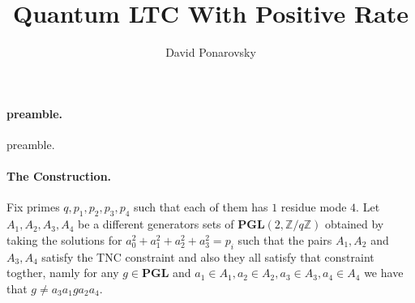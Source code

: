 \documentclass{article}
\begin{document}
\title{Quantum LTC With Positive Rate}
\author{David Ponarovsky}
\maketitle
\begin{multicols*}{2}
\newcommand{ \Hw }{ \delta\Delta -\Delta^{\frac{1}{2}-\varepsilon}/\delta  }
	\newcommand{ \Nw }{ \Delta^{\frac{3}{2}-\varepsilon}} 
	  \newcommand{ \Gu } { \Gamma^{\cup} }
	  \newcommand{ \Guq } { \Gamma^{\cup, \square} }

    	\newcommand{ \Gsa } {\Gamma_{\square_{1}} }
	\newcommand{ \Gsah } { \Gamma_{\square_{1}}^{h}} 
	\newcommand{ \Gsb } {\Gamma_{\square_{2}} }
	\newcommand{ \Gsbh } {\Gamma_{\square_{2}}^{h} }
	\newcommand{ \Gssh } { \Gamma_{\square \square }^{h}}
        \newcommand{ \Aa } { C_{A_{1}}}  
	\newcommand{ \Ab } { C_{A_{2}}}
	\newcommand{ \Ac } { C_{A_{3}}}
	\newcommand{ \Ad } { C_{A_{4}}}
	\newcommand{ \Aab } { \Aa \otimes \Ab } 
	\newcommand{ \Acd } { \Ac \otimes \Ad } 
	\newcommand{ \Aac } { \Aa \otimes \Ac }
	\newcommand{ \Aabc } { \Aa \otimes \Ab \otimes \Ac }
	\newcommand{ \Aabp } { \Aa^{\perp} \otimes \Ab^{\perp} } 
	\newcommand{ \Aacp } { \Aa^{\perp} \otimes \Ac^{\perp} }
	\newcommand{ \Acdp } { \Ac^{\perp} \otimes \Ad^{\perp} }
	\newcommand{ \Aabcdp } { \Aabp \otimes \Acdp }
	\newcommand{ \Aabcp } { \Aa^{\perp} \otimes \Ab^{\perp} \otimes \Ac^{\perp} }
	\newcommand{ \Aabpp } { \left( \Aabp \right)^\perp } 
	\newcommand{ \Acdpp } { \left( \Acdp \right)^\perp } 
	\newcommand{ \Aacpp } { \left( \Aacp \right)^\perp }
	\newcommand{ \Aabcpp } { \left( \Aabcp \right)^\perp }
	\newcommand{ \Aabcdpp } { \Aabpp \otimes \Acdpp  }
	\newcommand{ \YY } {  y_{1}y_{2}^{\top} }
	\newcommand{ \ZZ } {  z_{1}z_{2}^{\top} } 
	\newcommand{ \TT } { \tilde{\tau} }
	


  \paragraph{preamble.} preamble.  
  \paragraph{The Construction.} Fix primes $q,p_1,p_2,p_3,p_4$ such that each of them has $1 $ residue mode $4$. Let $A_{1},A_{2},A_{3},A_{4}$ be a different generators sets of $ \mathbf{PGL}(2 , \mathbb{Z} / q\mathbb{Z} )  $ 
  obtained by taking the solutions for $a_{0}^{2} + a_{1}^{2} +a_{2}^{2} +a_{3}^{2} = p_i $ such that the pairs $A_{1},A_{2}$ and $A_{3},A_{4}$ satisfy the 
  TNC constraint and also they all satisfy that constraint togther, namly for any $g \in \mathbf{PGL}$  and $a_{1}\in A_{1}, a_{2} \in A_{2}, a_{3} \in A_{3}, a_{4} \in A_{4}$ we have that $ g \neq a_{3}a_{1}ga_{2}a_{4}$. 
  

\end{multicols*}
\end{document}
